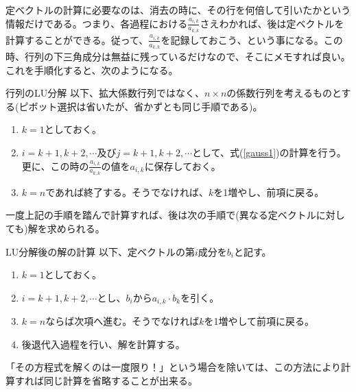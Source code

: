 定ベクトルの計算に必要なのは、消去の時に、その行を何倍して引いたかという情報だけである。つまり、各過程における$\frac{a_{i,k}}{a_{k,k}}$さえわかれば、後は定ベクトルを計算することができる。従って、$\frac{a_{i,k}}{a_{k,k}}$を記録しておこう、という事になる。この時、行列の下三角成分は無益に残っているだけなので、そこにメモすれば良い。これを手順化すると、次のようになる。
\begin{itembox}[l]{行列のLU分解}
以下、拡大係数行列ではなく、$n\times n$の係数行列を考えるものとする(ピボット選択は省いたが、省かずとも同じ手順である)。
\begin{enumerate}
\item $k=1$としておく。
\item $i=k+1,k+2,\cdots$及び$j=k+1,k+2,\cdots$として、式(\ref{gauss1})の計算を行う。更に、この時の$\frac{a_{i,k}}{a_{k,k}}$の値を$a_{i,k}$に保存しておく。
\item $k=n$であれば終了する。そうでなければ、$k$を1増やし、前項に戻る。
\end{enumerate}
\end{itembox}

一度上記の手順を踏んで計算すれば、後は次の手順で(異なる定ベクトルに対しても)解を求められる。
\begin{itembox}[l]{LU分解後の解の計算}
以下、定ベクトルの第$i$成分を$b_i$と記す。
\begin{enumerate}
\item $k=1$としておく。
\item $i=k+1,k+2,\cdots$とし、$b_i$から$a_{i,k}\cdot b_k$を引く。
\item $k=n$ならば次項へ進む。そうでなければ$k$を1増やして前項に戻る。
\item 後退代入過程を行い、解を計算する。
\end{enumerate}
\end{itembox}

「その方程式を解くのは一度限り！」という場合を除いては、この方法により計算すれば同じ計算を省略することが出来る。

